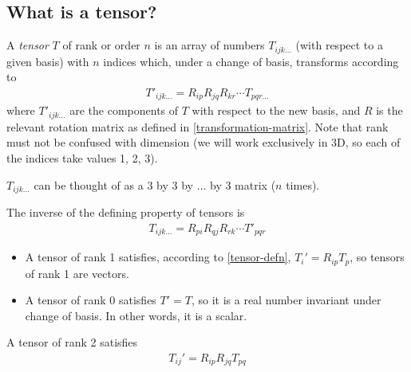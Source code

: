 \documentclass{../template/note}
\begin{document}
    \subsection{What is a tensor?}

    \begin{definition}
        \label{tensor-defn}
        A \emph{tensor} \(T\) of rank or order \(n\) is an array of numbers \(T_{ijk\dots}\) (with respect to a given basis) with \(n\) indices which, under a change of basis, transforms according to
        \begin{align*}
            T'_{ijk\dots} = R_{ip} R_{jq} R_{kr} \cdots T_{pqr \dots}
        \end{align*}
        where \(T'_{ijk\dots}\) are the components of \(T\) with respect to the new basis, and \(R\) is the relevant rotation matrix as defined in \cref{transformation-matrix}. Note that rank must not be confused with dimension (we will work exclusively in 3D, so each of the indices take values 1, 2, 3).        
    \end{definition}
    
    \begin{remark*}
        \(T_{ijk \dots}\) can be thought of as a 3 by 3 by \(\dots\) by 3 matrix (\(n\) times).
    \end{remark*}
    
    \begin{lemma}
        The inverse of the defining property of tensors is
        \begin{align*}
            T_{ijk \dots} = R_{pi} R_{qj} R_{rk} \cdots T'_{pqr}
        \end{align*}
    \end{lemma}
    
    \begin{example*}
        \begin{itemize}
            \item A tensor of rank 1 satisfies, according to \cref{tensor-defn}, \(T_i' = R_{ip} T_p\), so tensors of rank 1 are vectors.
            \item A tensor of rank 0 satisfies \(T' = T\), so it is a real number invariant under change of basis. In other words, it is a scalar.
        \end{itemize}
    \end{example*}
    
    \begin{proposition}
        A tensor of rank 2 satisfies
        \begin{align*}
            T_{ij}' = R_{ip} R_{jq} T_{pq}
        \end{align*}
    \end{proposition}
    
\end{document}
